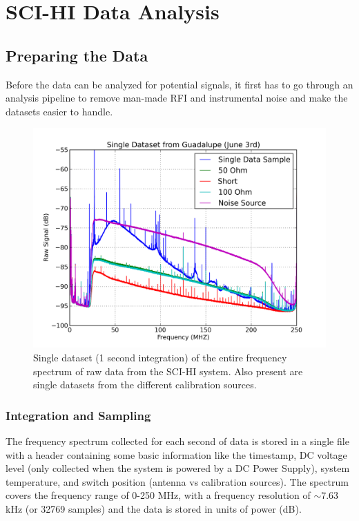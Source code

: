 \chapter{SCI-HI Data Analysis}\label{Ch:Data}

\section{Preparing the Data}

Before the data can be analyzed for potential signals, it first has to go through an analysis pipeline to remove man-made RFI and instrumental noise and make the datasets easier to handle. 

\begin{figure}[htb]
\begin{center}
\includegraphics[width=0.88\linewidth]{Data_analysis/figures/single_raw_guad_june03.png}
\caption{Single dataset (1 second integration) of the entire frequency spectrum of raw data from the SCI-HI system. Also present are single datasets from the different calibration sources. }
\label{Fig:raw_data}
\end{center}
\end{figure}

\subsection{Integration and Sampling}\label{Sec:int}

The frequency spectrum collected for each second of data is stored in a single file with a header containing some basic information like the timestamp, DC voltage level (only collected when the system is powered by a DC Power Supply), system temperature, and switch position (antenna vs calibration sources). The spectrum covers the frequency range of 0-250 MHz, with a frequency resolution of $\sim 7.63$ kHz (or 32769 samples) and the data is stored in units of power (dB).

